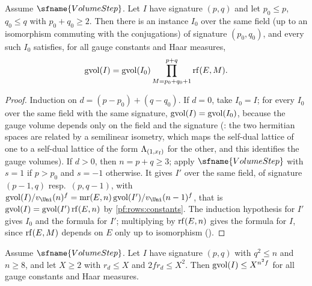 \begin{lemma}\label{pf:rows:volratio}
Assume $\sfname{VolumeStep}$. Let $I$ have signature $(p,q)$ and let $p_0\le p$, $q_0\le q$ with $p_0+q_0\ge2$. Then there is
an instance $I_0$ over the same field (up to an isomorphism commuting with the conjugations) of signature $(p_0,q_0)$, and
every such $I_0$ satisfies, for all gauge constants and Haar measures,
\[
\operatorname{gvol}(I)=\operatorname{gvol}(I_0)\prod_{M=p_0+q_0+1}^{p+q}\operatorname{rf}(E,M).
\]
\end{lemma}

\begin{proof}
Induction on $d=(p-p_0)+(q-q_0)$. If $d=0$, take $I_0=I$; for every $I_0$ over the same field with the same signature,
$\operatorname{gvol}(I)=\operatorname{gvol}(I_0)$, because the gauge volume depends only on the field and the signature
(: the two hermitian spaces are related by a
semilinear isometry, which maps the self-dual lattice of one to a self-dual lattice of the form $\Lambda_{(1,x_{\mathrm f})}$
for the other, and this identifies the gauge volumes). If $d>0$, then $n=p+q\ge3$; apply
$\sfname{VolumeStep}$ with $s=1$ if $p>p_0$ and $s=-1$ otherwise. It gives $I'$ over the same field, of signature $(p-1,q)$
resp.\ $(p,q-1)$, with $\rowsgv(I)/\rowsvU(n)^f=\rowsmr(E,n)\rowsgv(I')/\rowsvU(n-1)^f$, that is
$\operatorname{gvol}(I)=\operatorname{gvol}(I')\operatorname{rf}(E,n)$ by \cref{pf:rows:constants}. The induction hypothesis for $I'$ gives $I_0$ and
the formula for $I'$; multiplying by $\operatorname{rf}(E,n)$ gives the formula for $I$, since $\operatorname{rf}(E,M)$ depends on $E$ only up
to isomorphism ().
\end{proof}

\begin{lemma}\label{pf:rows:absvol}
Assume $\sfname{VolumeStep}$. Let $I$ have signature $(p,q)$ with $q^2\le n$ and $n\ge8$, and let $X\ge2$ with
$r_d\le X$ and $2fr_d\le X^2$. Then $\operatorname{gvol}(I)\le X^{n^2f}$ for all gauge constants and Haar measures.
\end{lemma}

